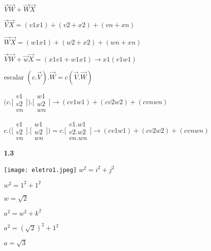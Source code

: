 \documentclass{article}
\begin{document}
$\vec V \vec W + \vec W \vec X $

$\vec V \vec X = (v1 x1) + (v2 + x2) + (vn + xn)$

$\vec W \vec X = (w1 x1) + (w2 + x2) + (wn + xn)$

$\vec V \vec W + \vec w \vec X = (x1v1 + w1x1) \rightarrow x1(v1w1)$\newline\newline

escalar
$(c. \vec V).\vec W = c(\vec V. \vec W)$

$\Bigg( c.\Bigg[ \begin{array}{c}
     v1 \\
     v2 \\
     vn
\end{array}{}\Bigg]\Bigg)
.\Bigg[ \begin{array}{c}
     w1 \\
     w2 \\
     wn
\end{array}{}\Bigg]
\rightarrow (cv1w1) + (cv2w2) + (cvnwn)$

$c.\Bigg(\Bigg[ \begin{array}{c}
     v1 \\
     v2 \\
     vn
\end{array}{}\Bigg]
.\Bigg[ \begin{array}{c}
     w1 \\
     w2 \\
     wn
\end{array}{}\Bigg]\Bigg)
= c.\Bigg[ \begin{array}{c}
     v1.w1 \\
     v2.w2 \\
     vn.wn
\end{array}{}\Bigg]
\rightarrow (cv1w1)+(cv2w2)+(cvnwn)
$\newline\newline


\textbf{1.3}

\texttt{[image: eletro1.jpeg]}\newline
$w^2= i^2+j^2$

$w^2= 1^2+1^2$

$w=\sqrt{2}$\newline

$a^2 = w^2 + k^2$

$ a^2 = (\sqrt{2})^2 + 1^2$

$a= \sqrt{3}$ \newline
\end{document}
